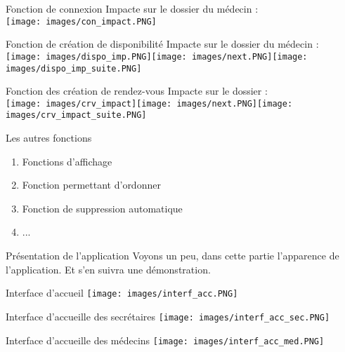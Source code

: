 \documentclass{beamer}
\begin{document}
\begin{frame}{Fonction de connexion}
\pause
Impacte sur le dossier du médecin : \\ \pause
\texttt{[image: images/con\_impact.PNG]}
\end{frame}

\begin{frame}{Fonction de création de disponibilité}
\pause Impacte sur le dossier du médecin : \\ \pause
\texttt{[image: images/dispo\_imp.PNG]}\texttt{[image: images/next.PNG]}\texttt{[image: images/dispo\_imp\_suite.PNG]}
\end{frame}

\begin{frame}{Fonction des création de rendez-vous}
\pause Impacte sur le dossier : \\ \pause
\texttt{[image: images/crv\_impact]}\texttt{[image: images/next.PNG]}\texttt{[image: images/crv\_impact\_suite.PNG]}
\end{frame}

\begin{frame}{Les autres fonctions}
\begin{enumerate}
\item Fonctions d'affichage \pause
\item Fonction permettant d'ordonner \pause
\item Fonction de suppression automatique \pause
\item...
\end{enumerate}
\end{frame}

\begin{frame}{Présentation de l'application}
Voyons un peu, dans cette partie l'apparence de l'application. Et s'en suivra une démonstration.
\end{frame}

\begin{frame}{Interface d'accueil}
\texttt{[image: images/interf\_acc.PNG]}
\end{frame}

\begin{frame}{Interface d'accueille des secrétaires}
\texttt{[image: images/interf\_acc\_sec.PNG]}

\end{frame}

\begin{frame}{Interface d'accueille des médecins}
\texttt{[image: images/interf\_acc\_med.PNG]}
\end{frame}
\end{document}
